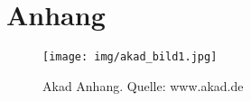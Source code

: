 \chapter{Anhang}

\begin{figure}[H]
\begin{center}
\texttt{[image: img/akad\_bild1.jpg]}
\caption[Akad Anhang]{Akad Anhang. Quelle: www.akad.de}
\end{center}
\end{figure}


